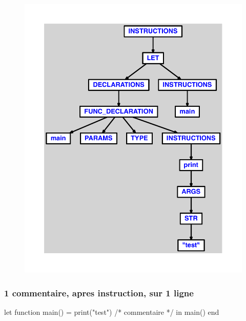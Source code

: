 \documentclass{article}
\begin{document}
\begin{figure}[H]\centering\includegraphics[max width=\textwidth]{ast/ast_151.pdf}\end{figure}\subsubsection{1 commentaire, apres instruction, sur 1 ligne}
\begin{verbatimtab}
let
	function main() = print("test")
	/* commentaire */
in main() end
\end{verbatimtab}
\end{document}
